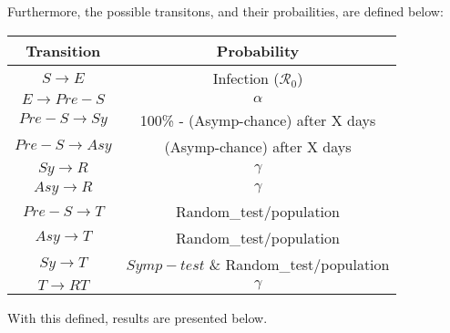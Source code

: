 \documentclass{article}
\numberwithin{equation}{section} %
\begin{document}
\begin{multicols}{2}
  Furthermore, the possible transitons, and their probailities, are defined below:

  \begin{tabular}{|c|c|}
    \hline
    Transition & Probability \\
    \hline
    $S \rightarrow E$ & Infection ($\mathcal{R}_0$) \\
    $E \rightarrow Pre-S$ & $\alpha$ \\
    $Pre-S \rightarrow Sy$ & 100\% - (Asymp-chance) after X days \\
    $Pre-S \rightarrow Asy$ & (Asymp-chance) after X days \\
    $Sy \rightarrow R$ & $\gamma$ \\
    $Asy \rightarrow R$ & $\gamma$\\
    $Pre-S \rightarrow T$ & Random\_test/population \\
    $Asy \rightarrow T$ & Random\_test/population\\
    $Sy \rightarrow T$ & $Symp-test$ \& Random\_test/population \\
    $T \rightarrow RT$ & $\gamma$ \\
    \hline
  \end{tabular}
\end{multicols}
  With this defined, results are presented below.
\end{document}
